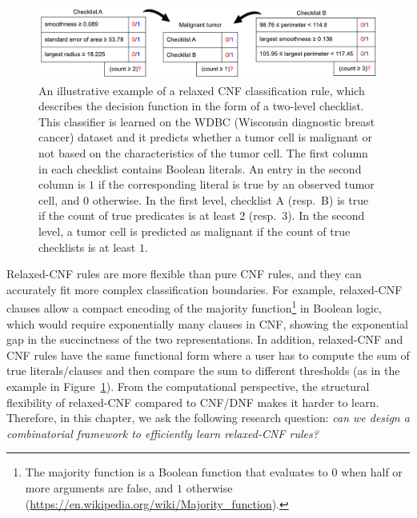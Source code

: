 \begin{figure}
	\begin{center}
		\includegraphics[scale=.65]{figures/interpretability/relaxed-cnf/checklist.pdf}
	\end{center}
	\caption[Illustration of a relaxed-CNF classification rule]{An illustrative example of a  relaxed CNF classification rule, which describes the decision function in the form of a  two-level checklist. This classifier is learned on the WDBC (Wisconsin diagnostic breast cancer) dataset and it predicts whether a tumor cell is malignant or not based on the characteristics of the  tumor cell. The first column in each checklist contains Boolean literals. An entry in the second column is  $ 1 $ if the corresponding literal is true by an observed tumor cell, and $ 0 $ otherwise. In the first level, checklist A (resp.\ B) is true if the count of true  predicates is at least $ 2 $ (resp.\ $ 3 $). In the second level, a tumor cell is predicted as malignant if the count of true checklists is at least $ 1 $. }
	\label{interpretability_crr_exmpl:wdbc}
\end{figure}




 {Relaxed-CNF rules are  more flexible than pure CNF rules, and they can accurately fit more complex classification boundaries.} For example, relaxed-CNF clauses  allow  a compact encoding of the majority function\footnote{The majority function is a Boolean function that evaluates to $ 0 $ when half or more arguments are false, and $ 1 $ otherwise (\url{https://en.wikipedia.org/wiki/Majority_function}).} in Boolean logic, which would require exponentially many clauses in CNF, showing the exponential gap in the succinctness of the two representations.  In addition, relaxed-CNF and CNF rules have the same functional form where a user has to compute the sum of true literals/clauses  and then compare the sum  to  different thresholds {(as in the example in Figure~\ref{interpretability_crr_exmpl:wdbc})}. From the computational perspective, the structural flexibility of relaxed-CNF compared to CNF/DNF makes it harder to learn. Therefore, in this chapter, we ask the following research question: \textit{can we design a combinatorial framework to efficiently learn relaxed-CNF rules?}

